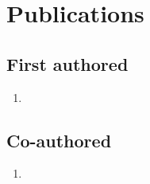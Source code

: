 \documentclass[a4paper,
               bibliography=totoc,
               hidelinks,
               listof=totoc,
               twoside]{scrreprt}
\begin{document}
\section*{Publications}
\begin{refsection}

\begin{singlespace}
\begin{footnotesize}

\subsection*{First authored}
\begin{enumerate}[label=(\arabic*), itemindent=-0.5em]
    \item {}
\end{enumerate}

\subsection*{Co-authored}
\begin{enumerate}[resume, label={(\arabic*)}, itemindent=-0.5em]
    \item {}
\end{enumerate}

\end{footnotesize}
\end{singlespace}

\end{refsection}
\end{document}
